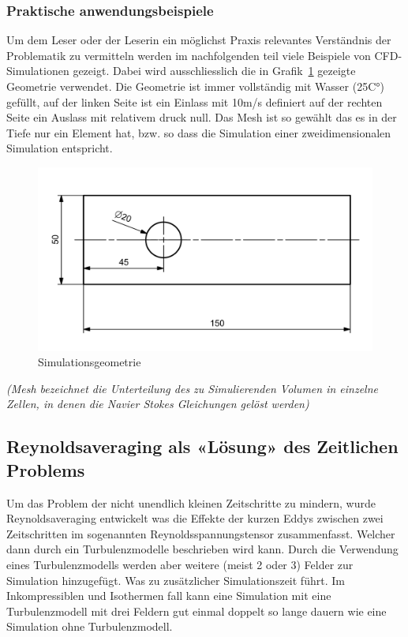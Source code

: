 \begin{refsection}
\subsubsection{Praktische anwendungsbeispiele}

Um dem Leser oder der Leserin ein möglichst Praxis relevantes Verständnis der Problematik zu vermitteln werden im nachfolgenden teil viele Beispiele von CFD-Simulationen gezeigt.
Dabei wird ausschliesslich die in Grafik~\ref{fig:SimDomain} gezeigte Geometrie verwendet.
Die Geometrie ist immer vollständig mit Wasser (25C°) gefüllt,
auf der linken Seite ist ein Einlass mit 10m/s definiert auf der rechten Seite ein Auslass mit relativem druck null.
Das Mesh ist so gewählt das es in der Tiefe nur ein Element hat, bzw. so dass die Simulation einer zweidimensionalen Simulation entspricht.

\begin{figure}
    \includegraphics[width=\textwidth]{papers/reynolds/images/domain.png}
    \caption{Simulationsgeometrie}
    \label{fig:SimDomain}
\end{figure}

\textit{(Mesh bezeichnet die Unterteilung des zu Simulierenden Volumen in einzelne Zellen, in denen die Navier Stokes Gleichungen gelöst werden)}

\subsection{Reynoldsaveraging als «Lösung» des Zeitlichen Problems}

Um das Problem der nicht unendlich kleinen Zeitschritte zu mindern, wurde Reynoldsaveraging entwickelt was die Effekte der kurzen Eddys zwischen zwei Zeitschritten im sogenannten Reynoldsspannungstensor zusammenfasst.
Welcher dann durch ein Turbulenzmodelle beschrieben wird kann.
Durch die Verwendung eines Turbulenzmodells werden aber weitere (meist 2 oder 3) Felder zur Simulation hinzugefügt. Was zu zusätzlicher Simulationszeit führt.
Im Inkompressiblen und Isothermen fall kann eine Simulation mit eine Turbulenzmodell mit drei Feldern gut einmal doppelt so lange dauern wie eine Simulation ohne Turbulenzmodell.


\end{refsection}
